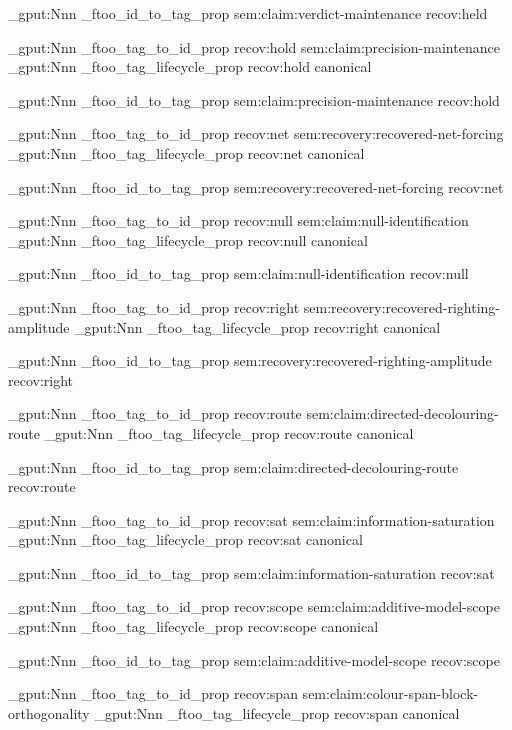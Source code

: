 \prop_gput:Nnn \g_ftoo_id_to_tag_prop { sem:claim:verdict-maintenance } { recov:held }


\prop_gput:Nnn \g_ftoo_tag_to_id_prop { recov:hold } { sem:claim:precision-maintenance }
\prop_gput:Nnn \g_ftoo_tag_lifecycle_prop { recov:hold } { canonical }

\prop_gput:Nnn \g_ftoo_id_to_tag_prop { sem:claim:precision-maintenance } { recov:hold }


\prop_gput:Nnn \g_ftoo_tag_to_id_prop { recov:net } { sem:recovery:recovered-net-forcing }
\prop_gput:Nnn \g_ftoo_tag_lifecycle_prop { recov:net } { canonical }

\prop_gput:Nnn \g_ftoo_id_to_tag_prop { sem:recovery:recovered-net-forcing } { recov:net }


\prop_gput:Nnn \g_ftoo_tag_to_id_prop { recov:null } { sem:claim:null-identification }
\prop_gput:Nnn \g_ftoo_tag_lifecycle_prop { recov:null } { canonical }

\prop_gput:Nnn \g_ftoo_id_to_tag_prop { sem:claim:null-identification } { recov:null }


\prop_gput:Nnn \g_ftoo_tag_to_id_prop { recov:right } { sem:recovery:recovered-righting-amplitude }
\prop_gput:Nnn \g_ftoo_tag_lifecycle_prop { recov:right } { canonical }

\prop_gput:Nnn \g_ftoo_id_to_tag_prop { sem:recovery:recovered-righting-amplitude } { recov:right }


\prop_gput:Nnn \g_ftoo_tag_to_id_prop { recov:route } { sem:claim:directed-decolouring-route }
\prop_gput:Nnn \g_ftoo_tag_lifecycle_prop { recov:route } { canonical }

\prop_gput:Nnn \g_ftoo_id_to_tag_prop { sem:claim:directed-decolouring-route } { recov:route }


\prop_gput:Nnn \g_ftoo_tag_to_id_prop { recov:sat } { sem:claim:information-saturation }
\prop_gput:Nnn \g_ftoo_tag_lifecycle_prop { recov:sat } { canonical }

\prop_gput:Nnn \g_ftoo_id_to_tag_prop { sem:claim:information-saturation } { recov:sat }


\prop_gput:Nnn \g_ftoo_tag_to_id_prop { recov:scope } { sem:claim:additive-model-scope }
\prop_gput:Nnn \g_ftoo_tag_lifecycle_prop { recov:scope } { canonical }

\prop_gput:Nnn \g_ftoo_id_to_tag_prop { sem:claim:additive-model-scope } { recov:scope }


\prop_gput:Nnn \g_ftoo_tag_to_id_prop { recov:span } { sem:claim:colour-span-block-orthogonality }
\prop_gput:Nnn \g_ftoo_tag_lifecycle_prop { recov:span } { canonical }

